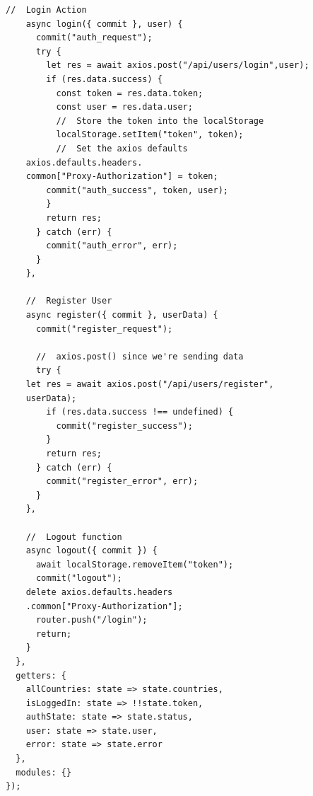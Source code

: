 \documentclass[twoside, a4paper, 12pt]{report}
\begin{document}
\begin{lstlisting}[frame=single]
    //  Login Action
    async login({ commit }, user) {
      commit("auth_request");
      try {
        let res = await axios.post("/api/users/login",user);
        if (res.data.success) {
          const token = res.data.token;
          const user = res.data.user;
          //  Store the token into the localStorage
          localStorage.setItem("token", token);
          //  Set the axios defaults
	axios.defaults.headers.
	common["Proxy-Authorization"] = token;
        commit("auth_success", token, user);
        }
        return res;
      } catch (err) {
        commit("auth_error", err);
      }
    },

    //  Register User
    async register({ commit }, userData) {
      commit("register_request");

      //  axios.post() since we're sending data
      try {
	let res = await axios.post("/api/users/register", 
	userData);
        if (res.data.success !== undefined) {
          commit("register_success");
        }
        return res;
      } catch (err) {
        commit("register_error", err);
      }
    },

    //  Logout function
    async logout({ commit }) {
      await localStorage.removeItem("token");
      commit("logout");
	delete axios.defaults.headers
	.common["Proxy-Authorization"];
      router.push("/login");
      return;
    }
  },
  getters: {
    allCountries: state => state.countries,
    isLoggedIn: state => !!state.token,
    authState: state => state.status,
    user: state => state.user,
    error: state => state.error
  },
  modules: {}
});

\end{lstlisting}
\end{document}
